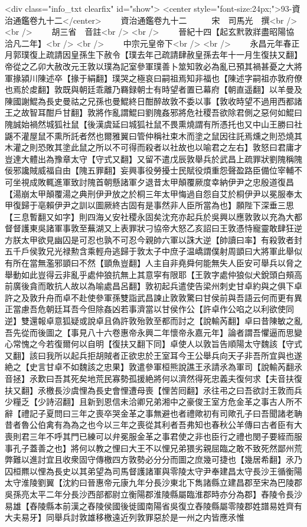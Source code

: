<div class="info_txt clearfix" id="show">
<center style="font-size:24px;">93-資治通鑑卷九十二</center>
  　　資治通鑑卷九十二　　　宋　司馬光　撰<br />
<br />
　　胡三省　音註<br />
<br />
　　晉紀十四【起玄黓敦牂盡昭陽協洽凡二年】<br />
<br />
　　中宗元皇帝下<br />
<br />
　　永昌元年春正月郭璞復上疏請因皇孫生下赦令【璞去年己疏請肆赦皇孫去年十一月生復扶又翻】帝從之乙卯大赦改元王敦以璞為記室參軍璞善卜筮知敦必為亂已預其禍甚憂之大將軍掾潁川陳述卒【掾于絹翻】璞哭之極哀曰嗣祖焉知非福也【陳述字嗣祖亦敦府僚也焉於䖍翻】敦既與朝廷乖離乃羇録朝士有時望者置已幕府【朝直遥翻】以羊曼及陳國謝鯤為長史曼祜之兄孫也曼鯤終日酣醉故敦不委以事【敦收時望不過用西都諸王之故智耳酣戶甘翻】敦將作亂謂鯤曰劉隗姦邪將危社稷吾欲除君側之惡何如鯤曰隗誠始禍然城狐社鼠【後漢虞延曰城狐社鼠不畏熏燒謂有所憑托也又中山王勝曰社鼷不灌屋鼠不熏所託者然也爾雅翼曰管仲稱社束木而塗之鼠因往託焉燻之則恐燒其木灌之則恐敗其塗此鼠之所以不可得而殺者以社故也以喻君之左右】敦怒曰君庸才豈達大體出為豫章太守【守式又翻】又留不遣戊辰敦舉兵於武昌上疏罪狀劉隗稱隗佞邪讒賊威福自由【隗五罪翻】妄興事役勞擾士民賦役煩重怨聲盈路臣備位宰輔不可坐視成敗輒進軍致討隗首朝懸諸軍夕退昔太甲顛覆厥度幸納伊尹之忠殷道復昌【湯崩太甲顛覆湯之典刑伊尹放之於桐三年太甲悔過自怨自艾於桐伊尹以冕服奉太甲復歸于亳賴伊尹之訓以圖厥終古固有是事然非人臣所當為也】願陛下深垂三思【三息暫翻又如字】則四海乂安社稷永固矣沈充亦起兵於吳興以應敦敦以充為大都督督護東吳諸軍事敦至蕪湖又上表罪狀刁協帝大怒乙亥詔曰王敦憑恃寵靈敢肆狂逆方朕太甲欲見幽囚是可忍也孰不可忍今親帥六軍以誅大逆【帥讀曰率】有殺敦者封五千戶侯敦兄光禄勲含乘輕舟逃歸于敦太子中庶子温嶠謂僕射周顗曰大將軍此舉似有所在當無濫邪顗曰不然【顗魚豈翻】人主自非堯舜何能無失人臣安可舉兵以脅之舉動如此豈得云非亂乎處仲狼抗無上其意寜有限耶【王敦字處仲狼似犬銳頭白頰高前廣後貪而敢抗人故以為喻處昌呂翻】敦初起兵遣使告梁州刺史甘卓約與之俱下卓許之及敦升舟而卓不赴使參軍孫雙詣武昌諫止敦敦驚曰甘侯前與吾語云何而更有異正當慮吾危朝廷耳吾今但除姦凶若事濟當以甘侯作公【許卓作公啗之以利欲使同逆】雙還報卓意狐疑或說卓且偽許敦殆敦至都而討之【說輸芮翻】卓曰昔陳敏之亂吾先從而後圖之【事見八十六卷惠帝永興二年懷帝永嘉元年】論者謂吾懼逼而思變心常愧之今若復爾何以自明【復扶又翻下同】卓使人以敦旨告順陽太守魏該【守式又翻】該曰我所以起兵拒胡賊者正欲忠於王室耳今王公舉兵向天子非吾所宜與也遂絶之【史言甘卓不如魏該之忠果】敦遣參軍桓熊說譙王氶請氶為軍司【說輸芮翻氶音拯】氶歎曰吾其死矣地荒民寡勢孤援絶將何以濟然得死忠義夫復何求【夫音扶復扶又翻】氶檄長沙虞悝為長史會悝遭母喪【悝苦囘翻】氶往弔之曰吾欲討王敦而兵少糧乏【少詩沼翻】且新到恩信未洽卿兄弟湘中之豪俊王室方危金革之事古人所不辭【禮記子夏問曰三年之喪卒哭金革之事無避也者禮歟初有司歟孔子曰吾聞諸老聃昔者魯公伯禽有為為之也今以三年之喪從其利者吾弗知也春秋公羊傳曰古者臣有大喪則君三年不呼其門已練可以弁冕服金革之事君使之非也臣行之禮也閔子要絰而服事孔子蓋善之也】將何以教之悝曰大王不以悝兄弟猥劣親屈臨之敢不致死然鄙州荒弊難以進討宜且收衆固守傳檄四方敦勢必分分而圖之庶幾可捷也【幾居希翻】氶乃囚桓羆以悝為長史以其弟望為司馬督護諸軍與零陵太守尹奉建昌太守長沙王循衡陽太守淮陵劉翼【沈約曰晉惠帝元康九年分長沙東北下雋諸縣立建昌郡至宋為巴陵郡吳孫亮太平二年分長沙西部都尉立衡陽郡淮陵縣屬臨淮郡時亦分為郡】舂陵令長沙易雄【舂陵縣本前漢之舂陵侯國後徙國南陽省吳復立舂陵縣屬零陵郡姓譜易姓齊有大夫易牙】同舉兵討敦雄移檄遠近列敦罪惡於是一州之内皆應氶惟